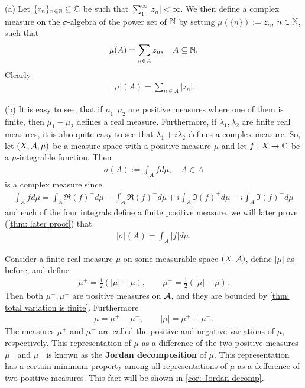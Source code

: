 \begin{example}\label{ex: example to prove}
(a) Let $\{z_{n}\}_{n\in \mathbb{N}}\subseteq \mathbb{C}$ be such that $\sum_{1}^{\infty}|z_{n}|<\infty$. We then define a complex measure on the $\sigma$-algebra of the power set of $\mathbb{N}$ by setting $\mu(\{n\}):=z_{n}$, $n\in \mathbb{N}$, such that
\begin{align*}
	\mu(A)=\sum_{n\in A}z_{n}, \quad A\subseteq \mathbb{N}.
\end{align*}
Clearly
\begin{align*}
	|\mu|(A)=\sum_{n\in A}|z_{n}|.
\end{align*}

(b)
It is easy to see, that if $\mu_{1}, \mu_{2}$ are positive measures where one of them is finite, then $\mu_{1}-\mu_{2}$ defines a real measure. Furthermore, if $\lambda_{1}, \lambda_{2}$ are finite real measures, it is also quite easy to see that $\lambda_{1}+i\lambda_{2}$ defines a complex measure. So, let $(X, \mathcal{A}, \mu)$ be a measure space with a positive measure $\mu$ and let $f:X\to \mathbb{C}$ be a $\mu$-integrable function. Then
\begin{align*}
	\sigma(A):=\int_{A}fd\mu, \quad A\in A
\end{align*}
is a complex measure since
\begin{align*}
	\int_{A}fd\mu=\int_{A}\mathfrak{R}(f)^{+}d\mu-\int_{A}\mathfrak{R}(f)^{-}d\mu+i\int_{A}\mathfrak{I}(f)^{+}d\mu-i\int_{A}\mathfrak{I}(f)^{-}d\mu
\end{align*}
and each of the four integrals define a finite positive measure.
we will later prove (\cref{thm: later proof}) that
\begin{align*}
	|\sigma|(A)=\int_{A}|f|d\mu.
\end{align*}
\end{example}


\begin{definition}\label{def: positive and negative variations}
Consider a finite real measure $\mu$ on some measurable space $(X, \mathcal{A})$, define $|\mu|$ as before, and define
\begin{align*}
	\mu^{+}=\frac{1}{2}(|\mu|+\mu), \qquad \mu^{-}=\frac{1}{2}(|\mu|-\mu).
\end{align*}
Then both $\mu^{+}, \mu^{-}$ are positive measures on $\mathcal{A}$, and they are bounded by \cref{thm: total variation is finite}. Furthermore
\begin{align*}
	\mu=\mu^{+}-\mu^{-}, \qquad |\mu|=\mu^{+}+\mu^{-}.
\end{align*}
The measures $\mu^{+}$ and $\mu^{-}$ are called the positive and negative variations of $\mu$, respectively. This representation of $\mu$ as a difference of the two positive measures $\mu^{+}$ and $\mu^{-}$ is known as the \textbf{Jordan decomposition } of $\mu$. This representation has a certain minimum property among all representations of $\mu$ as a defference of two positive measures. This fact will be shown in \cref{cor: Jordan decomp}.
\end{definition}


